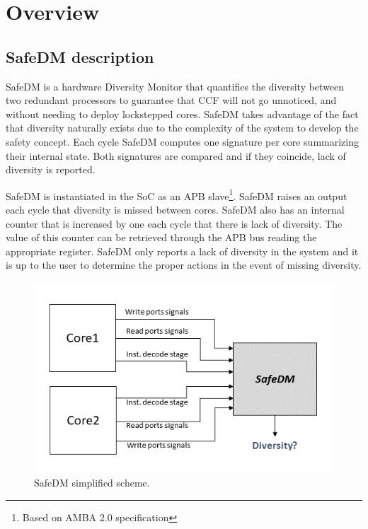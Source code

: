 \newpage
\section{Overview}
\label{chapter1}

\subsection{SafeDM description}
\label{descrption_subsec}

SafeDM is a hardware Diversity Monitor that quantifies the diversity between two redundant processors to guarantee that CCF will not go unnoticed, and without needing to deploy lockstepped cores. SafeDM takes advantage of the fact that diversity naturally exists due to the complexity of the system to develop the safety concept. Each cycle SafeDM computes one signature per core summarizing their internal state. Both signatures are compared and if they coincide, lack of diversity is reported.

SafeDM is instantiated in the SoC as an APB slave\footnote{Based on AMBA 2.0 specification}. SafeDM raises an output each cycle that diversity is missed between cores. SafeDM also has an internal counter that is increased by one each cycle that there is lack of diversity. The value of this counter can be retrieved through the APB bus reading the appropriate register. SafeDM only reports a lack of diversity in the system and it is up to the user to determine the proper actions in the event of missing diversity.


\begin{figure}[H]
	\includegraphics[keepaspectratio,width=\columnwidth]{img/SafeDM_scheme.png}
        \caption{SafeDM simplified scheme.} 
	\label{fig:simplified_scheme}
\end{figure}

